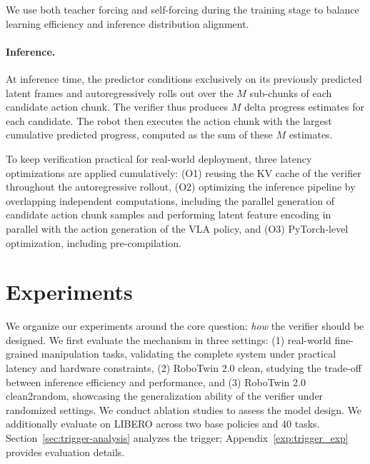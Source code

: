 \documentclass[10pt,twocolumn,letterpaper]{article}
\begin{document}
We use both teacher forcing and self-forcing \cite{huang2026self} during the training stage to balance learning efficiency and inference distribution alignment.

\paragraph{Inference.}

At inference time, the predictor conditions exclusively on its previously predicted latent frames and autoregressively rolls out over the $M$ sub-chunks of each candidate action chunk. The verifier thus produces $M$ delta progress estimates for each candidate. The robot then executes the action chunk with the largest cumulative predicted progress, computed as the sum of these $M$ estimates.

To keep verification practical for real-world deployment, three latency optimizations are applied cumulatively: (O1) reusing the KV cache of the verifier throughout the autoregressive rollout, (O2) optimizing the inference pipeline by overlapping independent computations, including the parallel generation of candidate action chunk samples and performing latent feature encoding in parallel with the action generation of the VLA policy, and (O3) PyTorch-level optimization, including pre-compilation.
\section{Experiments}
\label{sec:experiments}

We organize our experiments around the core question: \emph{how} the verifier should be designed.
We first evaluate the mechanism in three settings: (1) real-world fine-grained manipulation tasks, validating the complete system under practical latency and hardware constraints, (2) RoboTwin 2.0 clean, studying the trade-off between inference efficiency and performance, and (3) RoboTwin 2.0 clean2random, showcasing the generalization ability of the verifier under randomized settings. We conduct ablation studies to assess the model design.
We additionally evaluate on LIBERO across two base policies and 40 tasks. Section~\ref{sec:trigger-analysis} analyzes the trigger; Appendix~\ref{exp:trigger_exp} provides evaluation details.
\end{document}
